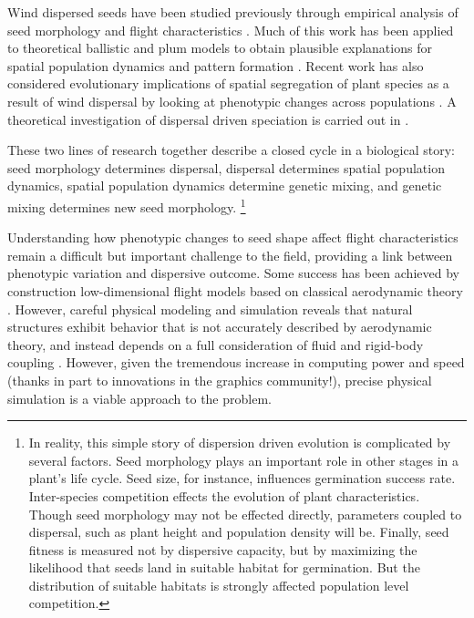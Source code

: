 \documentclass[annual]{acmsiggraph}
\begin{document}
Wind dispersed seeds have been studied previously through empirical analysis of seed morphology and flight characteristics \cite{augspurger1986}.  Much of this work has been applied to  theoretical ballistic and plum models  to obtain plausible explanations for spatial population dynamics and pattern formation \cite{levin2003}. Recent work has also considered  evolutionary implications of spatial segregation of  plant species as a result of wind dispersal by looking at phenotypic changes across  populations \cite{Cheptou2008}.   A theoretical investigation of dispersal driven speciation is carried out in \cite{levin2010}. 

These two lines of research together  describe a closed cycle in a biological story: seed morphology determines  dispersal, dispersal determines spatial population dynamics, spatial population dynamics determine genetic mixing, and genetic mixing determines new seed morphology.  \footnote{In reality, this simple story of dispersion driven evolution is complicated by several factors. Seed morphology  plays an important  role in  other stages in a plant's life cycle. Seed size, for instance, influences germination success rate.  Inter-species competition effects  the evolution of plant characteristics.   Though seed morphology may not be effected directly, parameters coupled to dispersal, such as plant height and population density will be.  Finally, seed fitness is measured not by dispersive capacity, but by maximizing the likelihood that  seeds land in suitable habitat for germination.  But the distribution of suitable habitats is strongly affected population level competition. }  


Understanding how phenotypic changes to seed shape affect  flight characteristics remain a difficult but important challenge to the field, providing a link between phenotypic variation and dispersive outcome.  Some success has been achieved by construction low-dimensional flight models based on classical aerodynamic theory \cite{greene2005}.  However, careful physical modeling and simulation reveals that natural structures exhibit behavior that is not accurately described by aerodynamic theory, and instead depends on a full consideration of fluid and rigid-body coupling \cite{wang2005}\cite{wang2012}.   However, given the tremendous increase in computing power and speed (thanks in part to innovations in the graphics community!),  precise physical simulation is a viable approach to the problem. 
\end{document}
